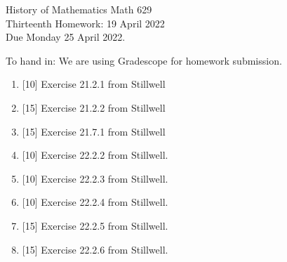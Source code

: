 \documentclass[12pt]{article}
\begin{document}
\LARGE 
\noindent
{\color{Maroon}History of Mathematics \hfill Math 629}\vspace{2pt}\\
\large
Thirteenth Homework: \hfill 19 April 2022\\
Due Monday 25 April 2022.
\normalsize\vspace{10pt}

To hand in: We are using Gradescope for homework submission.

\begin{enumerate}

\item  {[10]}
     Exercise 21.2.1 from Stillwell 
\item  {[15]}
     Exercise 21.2.2 from Stillwell 

\item  {[15]}
     Exercise 21.7.1 from Stillwell 

     
\item  {[10]}
  Exercise 22.2.2 from Stillwell.
\item  {[10]}
  Exercise 22.2.3 from Stillwell.
\item  {[10]}
  Exercise 22.2.4 from Stillwell.
\item  {[15]}
  Exercise 22.2.5 from Stillwell.
\item  {[15]}
  Exercise 22.2.6 from Stillwell.

  \end{enumerate}
\end{document}
